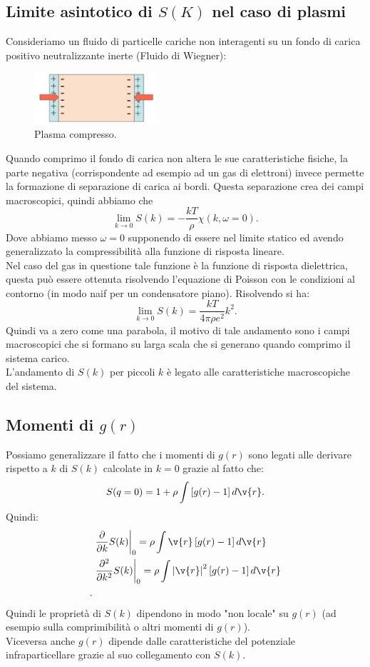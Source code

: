 \subsection{Limite asintotico di $S(K)$ nel caso di plasmi}
\label{subsec:Limite asintotico di $S(K)$ nel caso di plasmi}
Consideriamo un fluido di particelle cariche non interagenti su un fondo di carica positivo neutralizzante inerte (Fluido di Wiegner):
\begin{figure}[H]
	\centering
	\includegraphics[width=0.4\textwidth]{figures/Plasma-schiacciato.png}
	\caption{Plasma compresso.}
	\label{fig:figures-Plasma-schiacciato-png}
\end{figure}
Quando comprimo il fondo di carica non altera le sue caratteristiche fisiche, la parte negativa (corrispondente ad esempio ad un gas di elettroni) invece permette la formazione di separazione di carica ai bordi. Questa separazione crea dei campi macroscopici, quindi abbiamo che
\[
	\lim_{k \to 0} S(k) = -\frac{kT}{\rho }\chi(k, \omega = 0)
.\] 
Dove abbiamo messo $\omega = 0$ supponendo di essere nel limite statico ed avendo generalizzato la compressibilità alla funzione di risposta lineare.\\
Nel caso del gas in questione tale funzione è la funzione di risposta dielettrica, questa può essere ottenuta risolvendo l'equazione di Poisson con le condizioni al contorno (in modo naif per un condensatore piano). Risolvendo si ha:
\[
	\lim_{k \to 0} S(k) = \frac{kT}{4\pi\rho e^2}k^2
.\] 
Quindi va a zero come una parabola, il motivo di tale andamento sono i campi macroscopici che si formano su larga scala che si generano quando comprimo il sistema carico.\\
L'andamento di $S(k)$ per piccoli $k$ è legato alle caratteristiche macroscopiche del sistema.
\subsection{Momenti di $g(r)$}
\label{subsec:Momenti di $g(r)$$}
Possiamo generalizzare il fatto che i momenti di $g(r)$ sono legati alle derivare rispetto a $k$ di $S(k)$ calcolate in $k=0$ grazie al fatto che:
\[
	S(q=0)=1+\rho \int\left[ g(r)-1 \right] d \v{r}
.\] 
Quindi:
\[\begin{aligned}
	&\left.\frac{\partial }{\partial k} S(k)\right|_{0}
		= \rho \int \v{r} \left[ g(r)-1 \right] d \v{r}\\
	&\left.\frac{\partial^2 }{\partial k^2} S(k)\right|_{0}
		= \rho \int \left| \v{r} \right| ^2 \left[ g(r)-1 \right] d \v{r}\\
.\end{aligned}\]
Quindi le proprietà di $S(k)$ dipendono in modo "non locale" su $g(r)$ (ad esempio sulla comprimibilità o altri momenti di $g(r)$).\\
Viceversa anche $g(r)$ dipende dalle caratteristiche del potenziale infraparticellare grazie al suo collegamento con $S(k)$.

